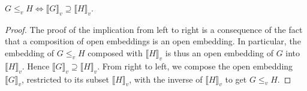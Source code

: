 \documentclass[runningheads]{llncs}
\newcommand{\tensor}{\otimes}
\newcommand{\vinterp}[1]{\llbracket #1 \rrbracket_v}
\begin{document}
\begin{proposition}
\label{match-interp-thm}
$G \leq_v H \Leftrightarrow \vinterp{G} \supseteq \vinterp{H}$.
\end{proposition}
\begin{proof}
  The proof of the implication from left to right is a consequence of
  the fact that a composition of open embeddings is an open embedding.
  In particular, the embedding of $G \leq_v H$ composed with
  $\vinterp{H}$ is thus an open embedding of $G$ into $\vinterp{H}$.
  Hence $\vinterp{G} \supseteq \vinterp{H}$. From right to left, we
  compose the open embedding $\vinterp{G}$, restricted to its subset
  $\vinterp{H}$, with the inverse of $\vinterp{H}$ to get $G \leq_v
  H$.
\end{proof}





\end{document}
